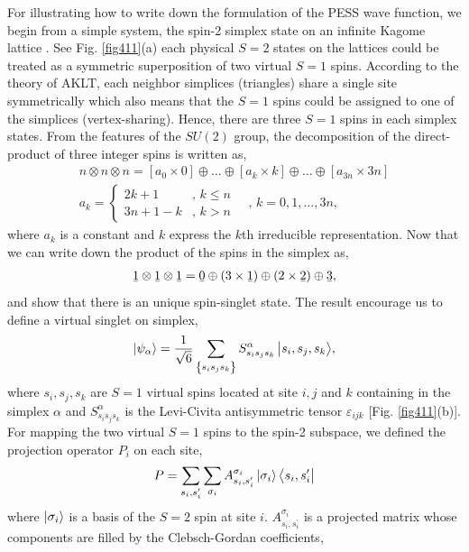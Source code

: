 For illustrating how to write down the formulation of the PESS wave function, we begin from a simple system, the spin-2 simplex state on an infinite Kagome lattice \cite{}. See Fig. \ref{fig411}(a) each physical $S=2$ states on the lattices could be treated as a symmetric superposition of two virtual $S=1$ spins. According to the theory of AKLT, each neighbor simplices (triangles) share a single site symmetrically which also means that the $S=1$ spins could be assigned to one of the simplices (vertex-sharing). Hence, there are three $S=1$ spins in each simplex states. From the features of the $SU(2)$ group, the decomposition of the direct-product of three integer spins is written as, 
\begin{align}
	\label{su2}
	n \otimes n \otimes n = [a_0 \times 0] \oplus \dots \oplus [a_k \times k] \oplus \dots \oplus [a_{3n} \times 3n] \\
	a_k = \begin{cases}
		2k + 1 & \text{, $k \leq n$} \\
		3n + 1 - k & \text{, $k > n$} 
	\end{cases}
	\quad \text{, } k = 0, 1, \dots , 3n ,
\end{align}
where $a_k$ is a constant and $k$ express the $k$th irreducible representation. Now that we can write down the product of the spins in the simplex as,  
\begin{align}
	\label{111}
	\barbelow{1} \otimes \barbelow{1} \otimes \barbelow{1} = \barbelow{0} \oplus \left( 3 \times \barbelow{1} \right) \oplus \left( 2 \times \barbelow{2} \right) \oplus \barbelow{3},
\end{align}
and show that there is an unique spin-singlet state. The result encourage us to define a virtual singlet on simplex,
\begin{align}
	\Ket{\psi_{\alpha}} = \frac{1}{\sqrt{6}} \sum_{\left\{ s_i s_j s_k\right\}}{S^{\alpha}_{s_i s_j s_k}\Ket{s_i, s_j, s_k}},
\end{align}
where $s_i,s_j,s_k$ are $S=1$ virtual spins located at site $i,j$ and $k$ containing in the simplex $\alpha$ and $S^{\alpha}_{s_i s_j s_k}$ is the Levi-Civita antisymmetric tensor $\varepsilon_{ijk}$ [Fig. \ref{fig411}(b)]. For mapping the two virtual $S=1$ spins to the spin-2 subspace, we defined the projection operator $P_i$ on each site,
\begin{align}
	P = \sum_{s_i,s^{\prime}_{i}}\sum_{\sigma_i}{A^{\sigma_i}_{s_i,s_i^{\prime}}\Ket{\sigma_i}\Bra{s_i,s_i^{\prime}}}
\end{align}
where $\Ket{\sigma_i}$ is a basis of the $S=2$ spin at site $i$. $A^{\sigma_i}_{s_i,s_i^{\prime}}$ is a projected matrix whose components are filled by the Clebsch-Gordan coefficients,
